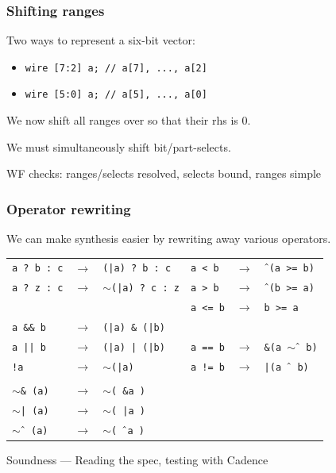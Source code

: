 \documentclass[mathserif]{beamer}
\begin{document}
\begin{frame}
\frametitle{Shifting ranges}

Two ways to represent a six-bit vector:
\begin{itemize}
\item \texttt{wire [7:2] a;  // a[7], ..., a[2]}
\item \texttt{wire [5:0] a;  // a[5], ..., a[0]}
\end{itemize}

\bigskip

We now shift all ranges over so that their rhs is 0.

We must simultaneously shift bit/part-selects.

\bigskip
WF checks: ranges/selects resolved, selects bound, ranges simple

\end{frame}


\begin{frame}
\frametitle{Operator rewriting}

We can make synthesis easier by rewriting away various operators.

\bigskip
\begin{tabular}{lll|lll}

{\tt a ?~b~:~c} & $\rightarrow$ & {\tt (|a)~?~b~:~c}       & {\tt a < b}  & $\rightarrow$ & {\tt $\Hat{\ }$(a >= b)} \\
{\tt a ?~z~:~c} & $\rightarrow$ & {\tt $\sim$(|a)~?~c~:~z} & {\tt a > b}  & $\rightarrow$ & {\tt $\Hat{\ }$(b >= a)} \\
& & & {\tt a <= b} & $\rightarrow$ & {\tt b >= a} \\
{\tt a \&\& b} & $\rightarrow$  & {\tt (|a) \& (|b)} \\
{\tt a || b}   &  $\rightarrow$ & {\tt (|a) | (|b)} & {\tt a == b} & $\rightarrow$ & {\tt \&(a $\sim$$\Hat{\ }$ b)} \\
{\tt !a}       & $\rightarrow$  & {\tt $\sim$(|a)} & {\tt a != b} & $\rightarrow$ & {\tt |(a $\Hat{\ }$ b)} \\
& & & \\
{\tt $\sim$\& (a)}        & $\rightarrow$ & {\tt  $\sim$( \&a )} \\
{\tt $\sim$| (a)}         & $\rightarrow$ & {\tt  $\sim$( |a )} \\
{\tt $\sim$$\Hat{\ }$ (a)} & $\rightarrow$ & {\tt $\sim$( $\Hat{\ }$a )} \\
\end{tabular}

\bigskip
Soundness --- Reading the spec, testing with Cadence

\end{frame}
\end{document}
